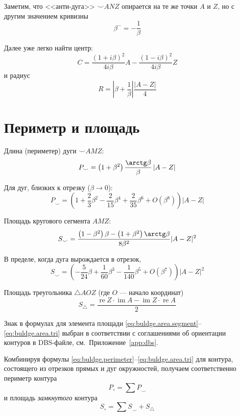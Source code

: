 Заметим, что <<анти-дуга>>
${\smile} ANZ$
опирается на те же точки
$A$ и $Z$,
но с другим значением кривизны
$$
\beta^- = -\frac{1}{\beta}
$$

Далее уже легко найти центр:
$$
C =
\frac{(1+i\beta)^2}{4i\beta}A
-
\frac{(1-i\beta)^2}{4i\beta}Z
$$
и радиус
$$
R = \left| \beta + \frac{1}\beta \right|
\frac{\left|A-Z \right|}4
$$

\section*{Периметр и площадь}

Длина
(периметер)
дуги
${\smile}AMZ$:
\begin{equation}
  \label{eq:buldge.perimeter}
  P_{\smile} =
  \left(1+\beta^2 \right)
  \frac{\arctg \beta}{\beta}
  \left| A - Z \right|
\end{equation}

Для дуг, близких к отрезку
($\beta \to 0$):
$$
P_{\smile} =
 \left(1+\frac{2}{3}\beta^2 - \frac{2}{15}\beta^4 + \frac{2}{35}\beta^6 +O(\beta^8)\right)
 \left| A - Z \right|
$$

Площадь кругового сегмента
$AMZ$:
\begin{equation}
  \label{eq:buldge.area.segment}
  S_{\smile}=
  \frac{\left(1 - \beta^2\right) \beta - \left(1+\beta^2\right)\arctg \beta}{8\beta^2}
  |A-Z|^2
\end{equation}

В пределе,
когда дуга вырождается в отрезок,
$$
S_{\smile}=
  \left(
    -\frac{5}{24} \beta + \frac{1}{60}\beta^3 -\frac{1}{140}\beta^5 + O(\beta^7)
  \right)|A-Z|^2
$$

Площадь треугольника
$\triangle AOZ$
(где $O$ --- начало координат)
\begin{equation}
  \label{eq:buldge.area.tri}
  S_{\triangle} =
  \frac{\operatorname{re} Z \cdot \operatorname{im} A - \operatorname{im} Z \cdot \operatorname{re} A}2
\end{equation}

Знак в формулах для элемента площади
\eqref{eq:buldge.area.segment}--\eqref{eq:buldge.area.tri}
выбран в соответствии с соглашениями об ориентации контуров
в DBS-файле,
см.~Приложение~\ref{app:dbs}.

Комбинируя формулы
\eqref{eq:buldge.perimeter}--\eqref{eq:buldge.area.tri}
для контура,
состоящего из отрезков прямых и дуг окружностей,
получаем соответственно периметр контура
$$
P_{\circ} =  \sum P_{\smile}
$$
и площадь
\textit{замкнутого}
контура
$$
S_{\circ} = \sum S_{\smile} + S_{\triangle}
$$

